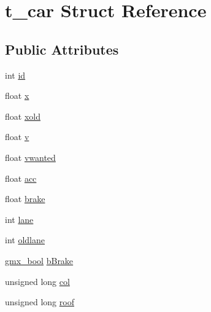 \hypertarget{structt__car}{\section{t\-\_\-car \-Struct \-Reference}
\label{structt__car}
}
\subsection*{\-Public \-Attributes}
\begin{DoxyCompactItemize}
\item 
int \hyperlink{structt__car_ae4e15e66283de93090043ebdb1459cf9}{id}
\item 
float \hyperlink{structt__car_a9db73a0f5dc8edda74116262ce5199ee}{x}
\item 
float \hyperlink{structt__car_ab52414bf59621bef578682ceacee2353}{xold}
\item 
float \hyperlink{structt__car_a861ad72035b6843654b659ec04331b6e}{v}
\item 
float \hyperlink{structt__car_a794716a87c7479186afd1113f78672ce}{vwanted}
\item 
float \hyperlink{structt__car_a3d974cfb09aa4555ce19b623589ac0cb}{acc}
\item 
float \hyperlink{structt__car_a99a3e9cc3f2c4f0d57e52ef87b9343fa}{brake}
\item 
int \hyperlink{structt__car_a4fc68a1290291bbca8b81e4809c81f1f}{lane}
\item 
int \hyperlink{structt__car_a3288b5d6b5c8860f803f01bbb5405c25}{oldlane}
\item 
\hyperlink{include_2types_2simple_8h_a8fddad319f226e856400d190198d5151}{gmx\-\_\-bool} \hyperlink{structt__car_a8c67c03c2cd5bd36ba04feadd45cbd50}{b\-Brake}
\item 
unsigned long \hyperlink{structt__car_ac5ad0d3582b9a696c171c3a943bf9c12}{col}
\item 
unsigned long \hyperlink{structt__car_a341c699151fbcf496fa8927b3224833e}{roof}
\end{DoxyCompactItemize}


